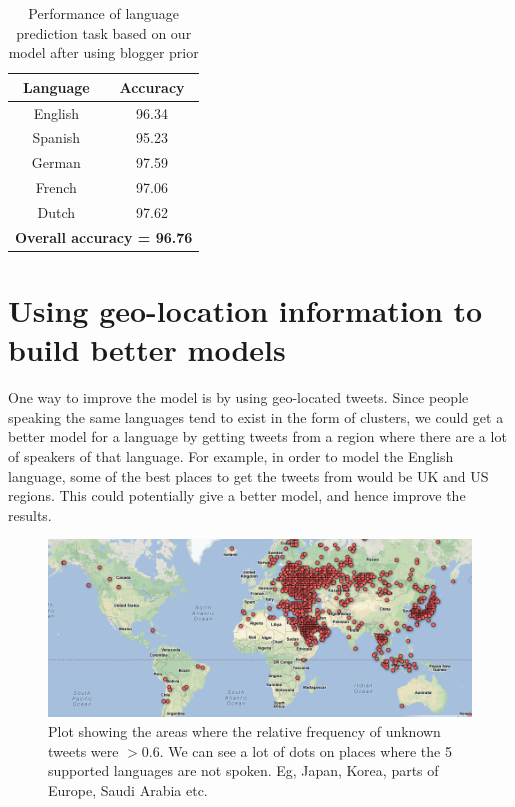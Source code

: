 \documentclass[11pt]{article}
\begin{document}
\begin{table}
\begin{center}
\small
\begin{tabular}{|c|c|}
\hline
\textbf{Language} & \textbf{Accuracy} \\
\hline
English & 96.34 \\
Spanish & 95.23 \\
German & 97.59 \\
French & 97.06 \\
Dutch & 97.62 \\ \hline
\multicolumn{2}{|c|}{\textbf{Overall accuracy = 96.76}} \\\hline
\end{tabular}
\caption{\footnotesize Performance of language prediction task based on our model after using blogger prior}
\end{center}
\end{table}

\section{Using geo-location information to build better models}
One way to improve the model is by using geo-located tweets. Since people speaking the same languages tend to exist in the form of clusters, we could get a better model for a language by getting tweets from a region where there are a lot of speakers of that language. For example, in order to model the English language, some of the best places to get the tweets from would be UK and US regions. This could potentially give a better model, and hence improve the results.

\begin{figure}[ht]
\includegraphics[scale=0.5]{unknown_plot.png}
\caption{\footnotesize Plot showing the areas where the relative frequency of unknown tweets were $> 0.6$. We can see a lot of dots on places where the 5 supported languages are not spoken. Eg, Japan, Korea, parts of Europe, Saudi Arabia etc.}
\label{fig:s4}
\end{figure}
\end{document}
